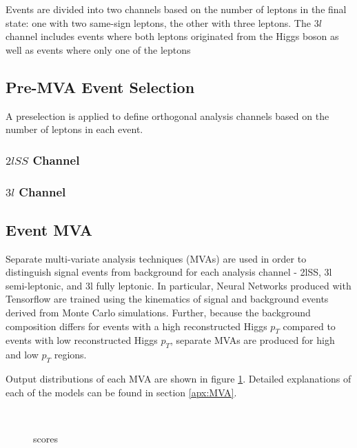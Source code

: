 Events are divided into two channels based on the number of leptons in the final state: one with two same-sign leptons, the other with three leptons. The $3l$ channel includes events where both leptons originated from the Higgs boson as well as events where only one of the leptons 


\subsection{Pre-MVA Event Selection}
\label{subsec:preMVA}

A preselection is applied to define orthogonal analysis channels based on the number of leptons in each event.

\subsubsection{$2lSS$ Channel}

\subsubsection{$3l$ Channel}


\subsection{Event MVA}
\label{subsec:sigBkgMVA}

Separate multi-variate analysis techniques (MVAs) are used in order to distinguish signal events from background for each analysis channel - 2lSS, 3l semi-leptonic, and 3l fully leptonic. In particular, Neural Networks produced with Tensorflow are trained using the kinematics of signal and background events derived from Monte Carlo simulations. Further, because the background composition differs for events with a high reconstructed Higgs $p_T$ compared to events with low reconstructed Higgs $p_T$, separate MVAs are produced for high and low $p_T$ regions.

Output distributions of each MVA are shown in figure \ref{fig:sigBkgScore}. Detailed explanations of each of the models can be found in section \ref{apx:MVA}.

\begin{figure}
  \\
  \label{fig:sigBkgScore}
  \caption{scores}
\end{figure}

